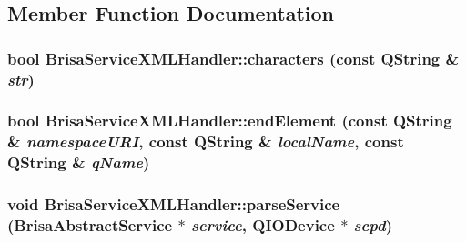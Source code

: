 \subsection{Member Function Documentation}
\hypertarget{classBrisaUpnp_1_1BrisaServiceXMLHandler_a146a0f538a0c48f70e211ed3b0a26fc0}{
\subsubsection[{characters}]{\setlength{\rightskip}{0pt plus 5cm}bool BrisaServiceXMLHandler::characters (const QString \& {\em str})}}
\label{classBrisaUpnp_1_1BrisaServiceXMLHandler_a146a0f538a0c48f70e211ed3b0a26fc0}
\hypertarget{classBrisaUpnp_1_1BrisaServiceXMLHandler_a9dd0d41c4d373f98ff7526de005f8c39}{
\subsubsection[{endElement}]{\setlength{\rightskip}{0pt plus 5cm}bool BrisaServiceXMLHandler::endElement (const QString \& {\em namespaceURI}, \/  const QString \& {\em localName}, \/  const QString \& {\em qName})}}
\label{classBrisaUpnp_1_1BrisaServiceXMLHandler_a9dd0d41c4d373f98ff7526de005f8c39}
\hypertarget{classBrisaUpnp_1_1BrisaServiceXMLHandler_a4805ae2d4d938e9cc47c130e73055c3e}{
\subsubsection[{parseService}]{\setlength{\rightskip}{0pt plus 5cm}void BrisaServiceXMLHandler::parseService ({\bf BrisaAbstractService} $\ast$ {\em service}, \/  QIODevice $\ast$ {\em scpd})}}
\label{classBrisaUpnp_1_1BrisaServiceXMLHandler_a4805ae2d4d938e9cc47c130e73055c3e}


